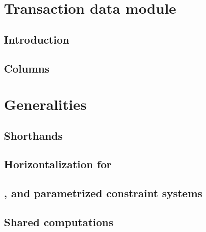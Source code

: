 
\section{Transaction data module}                                           \label{user txn data: generalities}
\subsection{Introduction}                                                   \label{user txn data: intro}                                       
\subsection{Columns}                                                        \label{user txn data: columns}                                     

\section{Generalities}                                                      \label{user txn data: generalities}                                
\subsection{Shorthands}                                                     \label{user txn data: constraints: shorthands}                     
\subsection{Horizontalization for \rlpTxnMod{}}                             \label{user txn data: constraints: horizontalization rlpTxn}       
\subsection{\wcpFlag{}, \eucFlag{} and parametrized constraint systems}     \label{user txn data: constraints: comparison constraints}         
\subsection{Shared computations}                                            \label{user txn data: constraints: common computations}            
